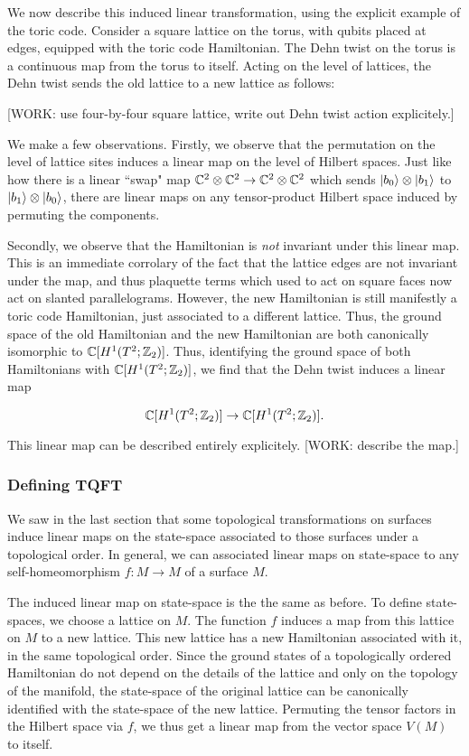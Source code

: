 We now describe this induced linear transformation, using the explicit example of the toric code. Consider a square lattice on the torus, with qubits placed at edges, equipped with the toric code Hamiltonian. The Dehn twist on the torus is a continuous map from the torus to itself. Acting on the level of lattices, the Dehn twist sends the old lattice to a new lattice as follows:

[WORK: use four-by-four square lattice, write out Dehn twist action explicitely.]

We make a few observations. Firstly, we observe that the permutation on the level of lattice sites induces a linear map on the level of Hilbert spaces. Just like how there is a linear ``swap" map ${\mathbb C}^2\otimes {\mathbb C}^2\to {\mathbb C}^2\otimes {\mathbb C}^2$ which sends $\ket{b_0}\otimes \ket{b_1}$ to $\ket{b_1}\otimes \ket{b_0}$, there are linear maps on any tensor-product Hilbert space induced by permuting the components.

Secondly, we observe that the Hamiltonian is \textit{not} invariant under this linear map. This is an immediate corrolary of the fact that the lattice edges are not invariant under the map, and thus plaquette terms which used to act on square faces now act on slanted parallelograms. However, the new Hamiltonian is still manifestly a toric code Hamiltonian, just associated to a different lattice. Thus, the ground space of the old Hamiltonian and the new Hamiltonian are both canonically isomorphic to ${\mathbb C}[H^1(T^2;{\mathbb Z}_2)]$. Thus, identifying the ground space of both Hamiltonians with ${\mathbb C}[H^1(T^2;{\mathbb Z}_2)]$, we find that the Dehn twist induces a linear map

$${\mathbb C}[H^1(T^2;{\mathbb Z}_2)]\to {\mathbb C}[H^1(T^2;{\mathbb Z}_2)].$$

This linear map can be described entirely explicitely. [WORK: describe the map.]

\subsubsection{Defining TQFT}

We saw in the last section that some topological transformations on surfaces induce linear maps on the state-space associated to those surfaces under a topological order. In general, we can associated linear maps on state-space to any self-homeomorphism $f:M\to M$ of a surface $M$.

The induced linear map on state-space is the the same as before. To define state-spaces, we choose a lattice on $M$. The function $f$ induces a map from this lattice on $M$ to a new lattice. This new lattice has a new Hamiltonian associated with it, in the same topological order. Since the ground states of a topologically ordered Hamiltonian do not depend on the details of the lattice and only on the topology of the manifold, the state-space of the original lattice can be canonically identified with the state-space of the new lattice. Permuting the tensor factors in the Hilbert space via $f$, we thus get a linear map from the vector space $V(M)$ to itself.

